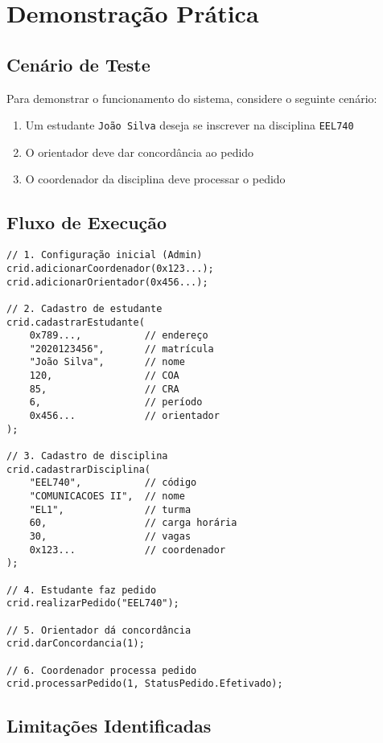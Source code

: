 \documentclass[12pt,a4paper]{article}
\begin{document}
\section{Demonstração Prática}

\subsection{Cenário de Teste}

Para demonstrar o funcionamento do sistema, considere o seguinte cenário:

\begin{enumerate}
    \item Um estudante \texttt{João Silva} deseja se inscrever na disciplina \texttt{EEL740}
    \item O orientador deve dar concordância ao pedido
    \item O coordenador da disciplina deve processar o pedido
\end{enumerate}

\subsection{Fluxo de Execução}

\begin{lstlisting}[caption=Exemplo de Uso Completo]
// 1. Configuração inicial (Admin)
crid.adicionarCoordenador(0x123...);
crid.adicionarOrientador(0x456...);

// 2. Cadastro de estudante
crid.cadastrarEstudante(
    0x789...,           // endereço
    "2020123456",       // matrícula
    "João Silva",       // nome
    120,                // COA
    85,                 // CRA
    6,                  // período
    0x456...            // orientador
);

// 3. Cadastro de disciplina
crid.cadastrarDisciplina(
    "EEL740",           // código
    "COMUNICACOES II",  // nome
    "EL1",              // turma
    60,                 // carga horária
    30,                 // vagas
    0x123...            // coordenador
);

// 4. Estudante faz pedido
crid.realizarPedido("EEL740");

// 5. Orientador dá concordância
crid.darConcordancia(1);

// 6. Coordenador processa pedido
crid.processarPedido(1, StatusPedido.Efetivado);
\end{lstlisting}

\subsection{Limitações Identificadas}
\end{document}
